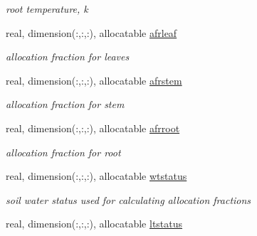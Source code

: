 \begin{DoxyCompactItemize}
\begin{DoxyCompactList}\small\item\em root temperature, k \end{DoxyCompactList}\item 
\hypertarget{structctem__statevars_1_1veg__rot_a6940a2c87afbfb988b72f1b553407535}{}real, dimension(\+:,\+:,\+:), allocatable \hyperlink{structctem__statevars_1_1veg__rot_a6940a2c87afbfb988b72f1b553407535}{afrleaf}\label{structctem__statevars_1_1veg__rot_a6940a2c87afbfb988b72f1b553407535}

\begin{DoxyCompactList}\small\item\em allocation fraction for leaves \end{DoxyCompactList}\item 
\hypertarget{structctem__statevars_1_1veg__rot_aeba524dba87965fa6e3b43d60380f3e4}{}real, dimension(\+:,\+:,\+:), allocatable \hyperlink{structctem__statevars_1_1veg__rot_aeba524dba87965fa6e3b43d60380f3e4}{afrstem}\label{structctem__statevars_1_1veg__rot_aeba524dba87965fa6e3b43d60380f3e4}

\begin{DoxyCompactList}\small\item\em allocation fraction for stem \end{DoxyCompactList}\item 
\hypertarget{structctem__statevars_1_1veg__rot_ad71980a0eef734d58d49b053ee1fa14e}{}real, dimension(\+:,\+:,\+:), allocatable \hyperlink{structctem__statevars_1_1veg__rot_ad71980a0eef734d58d49b053ee1fa14e}{afrroot}\label{structctem__statevars_1_1veg__rot_ad71980a0eef734d58d49b053ee1fa14e}

\begin{DoxyCompactList}\small\item\em allocation fraction for root \end{DoxyCompactList}\item 
\hypertarget{structctem__statevars_1_1veg__rot_a135c354c64556e3470cd2c92ee1772b3}{}real, dimension(\+:,\+:,\+:), allocatable \hyperlink{structctem__statevars_1_1veg__rot_a135c354c64556e3470cd2c92ee1772b3}{wtstatus}\label{structctem__statevars_1_1veg__rot_a135c354c64556e3470cd2c92ee1772b3}

\begin{DoxyCompactList}\small\item\em soil water status used for calculating allocation fractions \end{DoxyCompactList}\item 
\hypertarget{structctem__statevars_1_1veg__rot_a5e10f20bfba8f3321ddebbe164d70376}{}real, dimension(\+:,\+:,\+:), allocatable \hyperlink{structctem__statevars_1_1veg__rot_a5e10f20bfba8f3321ddebbe164d70376}{ltstatus}\label{structctem__statevars_1_1veg__rot_a5e10f20bfba8f3321ddebbe164d70376}


\end{DoxyCompactItemize}
